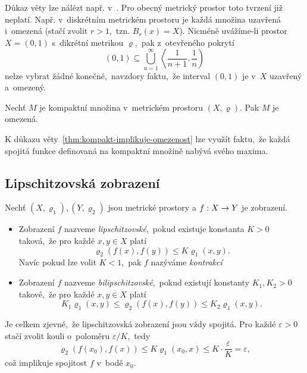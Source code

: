 Důkaz věty lze nálézt např. v~\citep[str. 166]{NetukaAnalyza2014}. Pro obecný metrický prostor toto tvrzení již neplatí. Např. v~diskrétním metrickém prostoru je každá množina uzavřená i~omezená (stačí zvolit $r>1$,~tzn. $B_r(x)=X$). Nicméně uvážíme-li prostor $X=(0,1)$ s~dikrétní metrikou $\varrho$,~pak z~otevřeného pokrytí
\[(0,1)\subseteq\bigcup_{n=1}^\infty\left\langle\dfrac{1}{n+1},\dfrac{1}{n}\right)\]
nelze vybrat žádné konečné,~navzdory faktu,~že interval $(0,1)$ je v~$X$ uzavřený a~omezený.
\begin{theorem}\label{thm:kompakt-implikuje-omezenost}
    Nechť $M$ je kompaktní množina v~metrickém prostoru $(X,\varrho)$. Pak $M$ je omezená.
\end{theorem}
K důkazu věty~\ref{thm:kompakt-implikuje-omezenost} lze využít faktu,~že každá spojitá funkce definovaná na kompaktní množině nabývá svého maxima.

\subsection{Lipschitzovská zobrazení}\label{subsec:lipschitzovska-zobrazeni}

\begin{definition}\label{def:bilipschitzovske-zobrazeni}
    Nechť $(X,\varrho_1),(Y,\varrho_2)$ jsou metrické prostory a $f:X \rightarrow Y$ je zobrazení.
    \begin{itemize}
        \item Zobrazení $f$ nazveme \emph{lipschitzovské},~pokud existuje konstanta $K>0$ taková,~že pro každé $x,y\in X$ platí
        \[\varrho_2(f(x),f(y))\leqslant K\varrho_1(x,y).\]
        Navíc pokud lze volit $K<1$,~pak $f$ nazýváme \emph{kontrakcí}
        \item Zobrazení $f$ nazveme \emph{bilipschitzovské},~pokud existují konstanty $K_1,K_2>0$ takové,~že pro každé $x,y\in X$ platí
        \[K_1\varrho_1(x,y)\leqslant\varrho_2(f(x),f(y))\leqslant K_2\varrho_1(x,y).\]
    \end{itemize}
\end{definition}
Je celkem zjevné,~že lipschitzovská zobrazení jsou vždy spojitá. Pro každé $\varepsilon>0$ stačí zvolit kouli o~poloměru $\varepsilon/K$,~tedy
\[\varrho_2(f(x_0),f(x))\leqslant K\varrho_1(x_0,x)\leqslant K\cdot\dfrac{\varepsilon}{K}=\varepsilon,\]
což implikuje spojitost $f$ v~bodě $x_0$.
